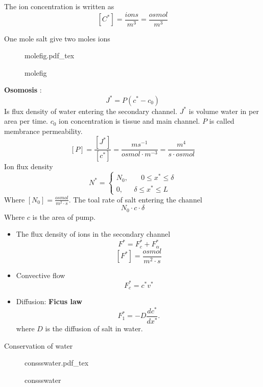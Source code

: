 \documentclass{article}
\newcommand{\incfig}[2][1]{%
\def\svgwidth{#1\columnwidth}
{#2.pdf_tex} } \pdfsuppresswarningpagegroup=1
\theoremstyle{remark}
\newcommand{\newpara}
  {
  \vskip 0.4cm
  }
\begin{document}
\newpara
The ion concentration is written as \[
\left[ C^{*} \right] = \frac{ions}{m^3} = \frac{osmol}{m^3} 
\] 

One mole salt give two moles ions

\begin{figure}[ht]
    \centering
    \incfig{molefig}
    \caption{molefig}
    \label{fig:molefig}
\end{figure}


\textbf{Osomosis} : \[
J^{* } = P\left( c^{* } - c_{0} \right)
\] 
Is flux density of water entering the secondary channel. $J^{*}$ is volume water in per area per time. $c_{0}$ ion concentration is tissue and main channel. $P$ is called membrance permeability. \[
\left[ P \right] = \frac{\left[ J^{*} \right]}{ \left[ c^{*} \right]}  = \frac{m s^{-1}}{ osmol \cdot m ^{-3}}  = \frac{m^{4}}{ s\cdot  osmol} 
\] 
Ion flux density \[
N^{*} = \begin{cases}
  N_{0},  &  \quad  0 \le x^{*} \le \delta  \\
  0,  &  \delta \le x^{* } \le L 
\end{cases}
\] 
Where $\left[ N_{0} \right] = \frac{osmol}{m^2 \cdot  s} $. The toal rate of salt entering the channel \[
N_{0} \cdot c\cdot \delta 
\] 
Where $c$ is the area of pump. 

\newpara
\begin{itemize}
  \item
 The flux density of ions in the secondary channel \[
 F^{*} = F_{c}^{* } + F_{\alpha } ^{*}
 \] 
 \[
 \left[ F^{*} \right] = \frac{osmol}{m^2 \cdot s} 
 \] 
 \item
Convective flow \[
F^{*} _{c} = c^{*} v^{*}
\] 
\item 
Diffusion: \textbf{Ficus law}  \[
F_{1}^{*} = - D \frac{d c^{*}}{d x^{*}}  .
\] 
where $D$ is the diffusion of salt in water.
\end{itemize}

Conservation of water 
\begin{figure}[ht]
    \centering
    \incfig{conssswater}
    \caption{conssswater}
    \label{fig:conssswater}
\end{figure}
\end{document}
